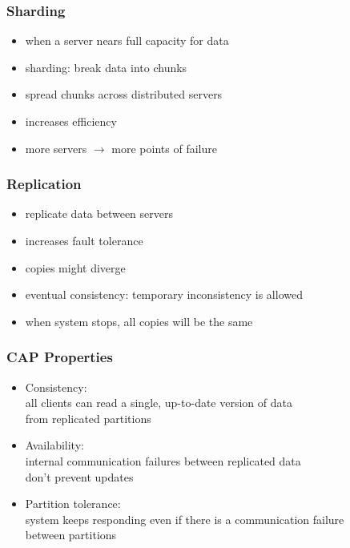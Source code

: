\documentclass[dvipsnames]{beamer}
\theoremstyle{plain}
\begin{document}
\begin{frame}
  \frametitle{Sharding}

  \begin{itemize}
    \item when a server nears full capacity for data
    \item \alert{sharding}: break data into chunks
    \item spread chunks across distributed servers

    \medskip
    \item increases efficiency
    \item more servers $\rightarrow$ more points of failure
  \end{itemize}
\end{frame}

\begin{frame}
  \frametitle{Replication}

  \begin{itemize}
    \item replicate data between servers
    \item increases fault tolerance

    \medskip
    \item copies might diverge
    \item \alert{eventual consistency}: temporary inconsistency is allowed
    \item when system stops, all copies will be the same
  \end{itemize}
\end{frame}

\begin{frame}
  \frametitle{CAP Properties}

  \begin{itemize}
    \item \alert{C}onsistency:\\
      all clients can read a single, up-to-date version of data\\
      from replicated partitions

    \medskip
    \item \alert{A}vailability:\\
      internal communication failures between replicated data\\
      don't prevent updates

    \medskip
    \item \alert{P}artition tolerance:\\
      system keeps responding even if there is a communication failure\\
      between partitions
  \end{itemize}
\end{frame}
\end{document}
